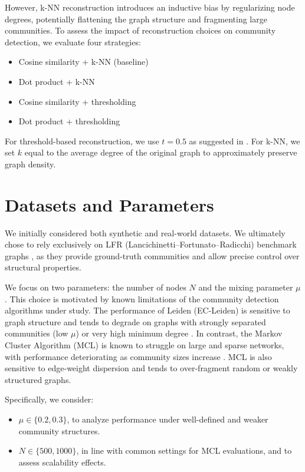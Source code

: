 \documentclass[a4paper,11pt]{article}
\begin{document}
However, k-NN reconstruction introduces an inductive bias by regularizing node degrees, potentially flattening the graph structure and fragmenting large communities. To assess the impact of reconstruction choices on community detection, we evaluate four strategies:
\begin{itemize}
    \item Cosine similarity + k-NN (baseline)
    \item Dot product + k-NN
    \item Cosine similarity + thresholding
    \item Dot product + thresholding
\end{itemize}
For threshold-based reconstruction, we use $t = 0.5$ as suggested in \cite{yip2023restore}. For k-NN, we set $k$ equal to the average degree of the original graph to approximately preserve graph density.

\section{Datasets and Parameters}
We initially considered both synthetic and real-world datasets. We ultimately chose to rely exclusively on LFR (Lancichinetti–Fortunato–Radicchi) benchmark graphs \cite{lancichinetti2008benchmark}, as they provide ground-truth communities and allow precise control over structural properties.

We focus on two parameters: the number of nodes $N$ and the mixing parameter $\mu$. This choice is motivated by known limitations of the community detection algorithms under study. The performance of Leiden (EC-Leiden) is sensitive to graph structure and tends to degrade on graphs with strongly separated communities (low $\mu$) or very high minimum degree \cite{dollmann2023graph}. In contrast, the Markov Cluster Algorithm (MCL) is known to struggle on large and sparse networks, with performance deteriorating as community sizes increase \cite{lancichinetti2009community}. MCL is also sensitive to edge-weight dispersion and tends to over-fragment random or weakly structured graphs.

Specifically, we consider:
\begin{itemize}
    \item $\mu \in \{0.2, 0.3\}$, to analyze performance under well-defined and weaker community structures.
    \item $N \in \{500, 1000\}$, in line with common settings for MCL evaluations, and to assess scalability effects.
\end{itemize}
\end{document}
